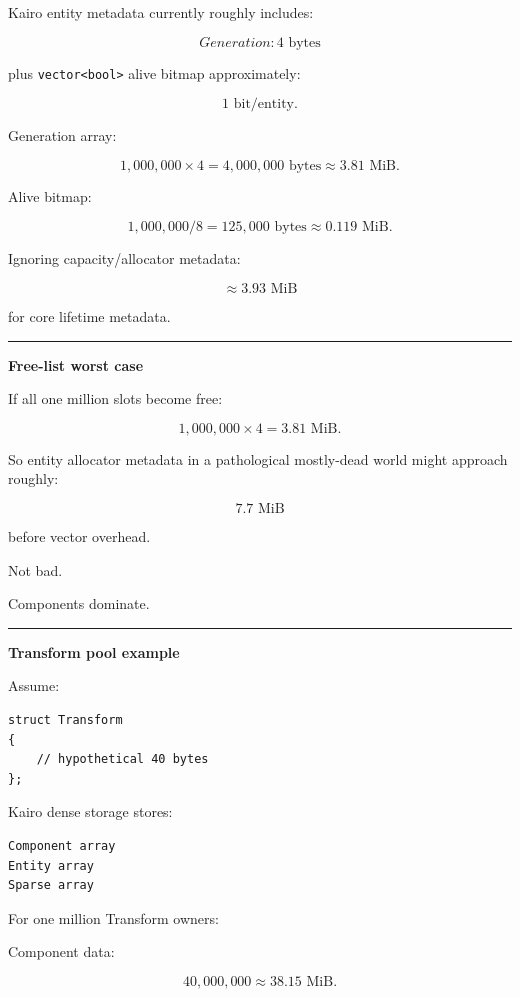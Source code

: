 Kairo entity metadata currently roughly includes:

\[
Generation:4\text{ bytes}
\]

plus \texttt{vector\textless{}bool\textgreater{}} alive bitmap approximately:

\[
1\text{ bit/entity}.
\]

Generation array:

\[
1,000,000\times4
=
4,000,000\text{ bytes}
\approx3.81\text{ MiB}.
\]

Alive bitmap:

\[
1,000,000/8
=
125,000\text{ bytes}
\approx0.119\text{ MiB}.
\]

Ignoring capacity/allocator metadata:

\[
\approx3.93\text{ MiB}
\]

for core lifetime metadata.

\begin{center}\rule{0.5\linewidth}{0.5pt}\end{center}

\textbf{Free-list worst case}

If all one million slots become free:

\[
1,000,000\times4
=
3.81\text{ MiB}.
\]

So entity allocator metadata in a pathological mostly-dead world might approach roughly:

\[
7.7\text{ MiB}
\]

before vector overhead.

Not bad.

Components dominate.

\begin{center}\rule{0.5\linewidth}{0.5pt}\end{center}

\textbf{Transform pool example}

Assume:

\begin{verbatim}
struct Transform
{
    // hypothetical 40 bytes
};
\end{verbatim}

Kairo dense storage stores:

\begin{verbatim}
Component array
Entity array
Sparse array
\end{verbatim}

For one million Transform owners:

Component data:

\[
40,000,000
\approx38.15\text{ MiB}.
\]

